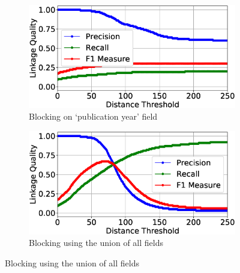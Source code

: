 \documentclass{llncs}
\begin{document}
\begin{figure}
\begin{subfigure}{.5\textwidth}
  \centering
\includegraphics[width=\textwidth]{figures/plotLQ-cora-trad-year}
\vspace{-6mm}
\caption{Blocking on `publication year' field}
\end{subfigure}%
\begin{subfigure}{.5\textwidth}
  \centering
\includegraphics[width=\textwidth]{figures/plotLQ-cora-trad-combined}
\vspace{-6mm}
\caption{Blocking using the union of all fields}
\end{subfigure} \vspace{5mm}


\end{figure}
\end{document}
